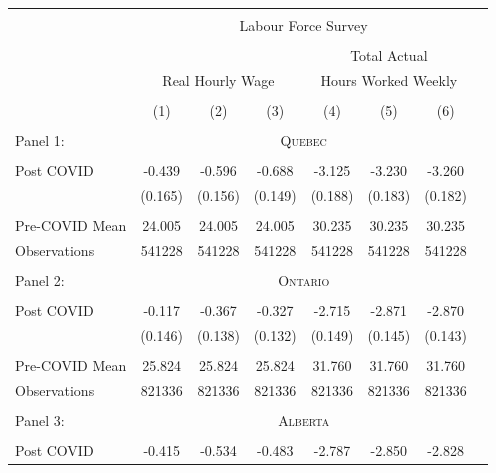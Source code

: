 \begin{tabular*}{\textwidth}{ @{\extracolsep{\fill}}l*{7}{c}}
\hline\hline
\\
 &\multicolumn{6}{c}{Labour Force Survey} \\
\cline{2-7} \\
& & & &\multicolumn{3}{c}{Total Actual} \\
&\multicolumn{3}{c}{Real Hourly Wage} &\multicolumn{3}{c}{Hours Worked Weekly} \\
\cline{2-4} \cline{5-7} \\
                                                  &\multicolumn{1}{c}{(1)}&\multicolumn{1}{c}{(2)}&\multicolumn{1}{c}{(3)}&\multicolumn{1}{c}{(4)}&\multicolumn{1}{c}{(5)}&\multicolumn{1}{c}{(6)}\\
\hline
\\
Panel 1: &\multicolumn{6}{c}{ \textsc{ Quebec } } \\
\hline
\\
Post COVID                                        &-0.439&-0.596&-0.688&-3.125&-3.230&-3.260\\
                                                  &(0.165)&(0.156)&(0.149)&(0.188)&(0.183)&(0.182)\\
\\
Pre-COVID Mean                                    &24.005&24.005&24.005&30.235&30.235&30.235\\
Observations                                      &541228&541228&541228&541228&541228&541228\\
\hline \hline
\\
Panel 2: &\multicolumn{6}{c}{ \textsc{ Ontario } } \\
\hline
\\
Post COVID                                        &-0.117&-0.367&-0.327&-2.715&-2.871&-2.870\\
                                                  &(0.146)&(0.138)&(0.132)&(0.149)&(0.145)&(0.143)\\
\\
Pre-COVID Mean                                    &25.824&25.824&25.824&31.760&31.760&31.760\\
Observations                                      &821336&821336&821336&821336&821336&821336\\
\hline \hline
\\
Panel 3: &\multicolumn{6}{c}{ \textsc{ Alberta } } \\
\hline
\\
Post COVID                                        &-0.415&-0.534&-0.483&-2.787&-2.850&-2.828\\

\end{tabular*}
